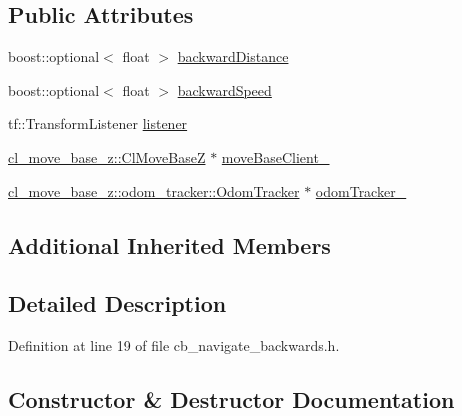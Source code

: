 \subsection*{Public Attributes}
\begin{DoxyCompactItemize}
\item 
boost\+::optional$<$ float $>$ \hyperlink{classcl__move__base__z_1_1CbNavigateBackwards_abb7099e4e18602f6cf06c4f5534a2a15}{backward\+Distance}
\item 
boost\+::optional$<$ float $>$ \hyperlink{classcl__move__base__z_1_1CbNavigateBackwards_aafadf3a154d4f805e63094a46a891764}{backward\+Speed}
\item 
tf\+::\+Transform\+Listener \hyperlink{classcl__move__base__z_1_1CbNavigateBackwards_a86be71ac1dd72f318875bee13259f3da}{listener}
\item 
\hyperlink{classcl__move__base__z_1_1ClMoveBaseZ}{cl\+\_\+move\+\_\+base\+\_\+z\+::\+Cl\+Move\+BaseZ} $\ast$ \hyperlink{classcl__move__base__z_1_1CbNavigateBackwards_a943c1a790eac9266adf11fbdc078f03a}{move\+Base\+Client\+\_\+}
\item 
\hyperlink{classcl__move__base__z_1_1odom__tracker_1_1OdomTracker}{cl\+\_\+move\+\_\+base\+\_\+z\+::odom\+\_\+tracker\+::\+Odom\+Tracker} $\ast$ \hyperlink{classcl__move__base__z_1_1CbNavigateBackwards_a75a8ae7aef6c72e96f4037c4941b0341}{odom\+Tracker\+\_\+}
\end{DoxyCompactItemize}
\subsection*{Additional Inherited Members}


\subsection{Detailed Description}


Definition at line 19 of file cb\+\_\+navigate\+\_\+backwards.\+h.



\subsection{Constructor \& Destructor Documentation}
\mbox{\label{classcl__move__base__z_1_1CbNavigateBackwards_aed93fbbdf28501d068ca4acb6a225d27}} 
